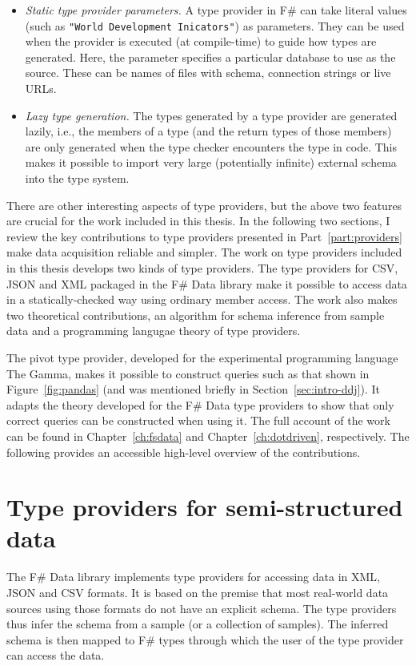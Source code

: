 \documentclass[fleqn,11pt]{report}
\theoremstyle{definition}
\newenvironment{nitemize}
{ \vspace{-0.4em}
  \begin{itemize}
    \setlength{\itemsep}{5pt}
    \setlength{\parskip}{0pt}
    \setlength{\parsep}{0pt} }
{ \end{itemize}
  \vspace{-0.4em} }
\begin{document}
\begin{nitemize}
\item \emph{Static type provider parameters.} A type provider in F\# can take literal values
  (such as \texttt{"World Development Inicators"}) as parameters. They can be used when the provider
  is executed (at compile-time) to guide how types are generated. Here, the parameter specifies
  a particular database to use as the source. These can be names of files with schema, connection
  strings or live URLs.

\item \emph{Lazy type generation.} The types generated by a type provider are generated lazily, i.e.,
  the members of a type (and the return types of those members) are only generated when the type
  checker encounters the type in code. This makes it possible to import very large (potentially
  infinite) external schema into the type system.
\end{nitemize}

There are other interesting aspects of type providers, but the above two features are crucial
for the work included in this thesis. In the following two sections, I review the key contributions
to type providers presented in Part~\ref{part:providers} make data acquisition reliable
and simpler.
%
The work on type providers included in this thesis develops two kinds of type providers.
The type providers for CSV, JSON and XML packaged in the F\# Data library make it possible
to access data in a statically-checked way using ordinary member access. The work also makes
two theoretical contributions, an algorithm for schema inference from sample data and a
programming langugae theory of type providers.

The pivot type provider, developed for the experimental programming language The Gamma,
makes it possible to construct queries such as that shown in Figure~\ref{fig:pandas} (and
was mentioned briefly in Section~\ref{sec:intro-ddj}). It adapts the theory developed for the
F\# Data type providers to show that only correct queries can be constructed when using it.
%
The full account of the work can be found in Chapter~\ref{ch:fsdata} and
Chapter~\ref{ch:dotdriven}, respectively. The following provides an accessible high-level overview
of the contributions.

\section{Type providers for semi-structured data}
The F\# Data library implements type providers for accessing data in XML, JSON and CSV formats.
It is based on the premise that most real-world data sources using those formats do not have an
explicit schema. The type providers thus infer the schema from a sample (or a collection of
samples). The inferred schema is then mapped to F\# types through which the user of the type
provider can access the data.
\end{document}
